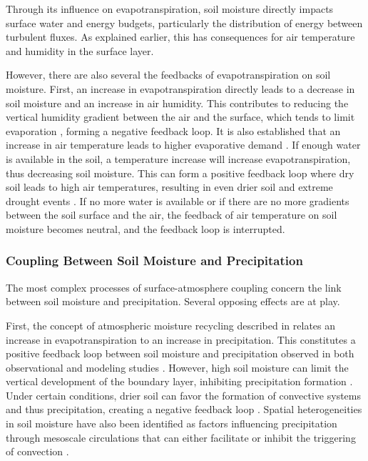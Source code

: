 Through its influence on evapotranspiration, soil moisture directly impacts surface water and energy budgets, particularly the distribution of energy between turbulent fluxes. As explained earlier, this has consequences for air temperature and humidity in the surface layer.

However, there are also several the feedbacks of evapotranspiration on soil moisture. First, an increase in evapotranspiration directly leads to a decrease in soil moisture and an increase in air humidity. This contributes to reducing the vertical humidity gradient between the air and the surface, which tends to limit evaporation \citep{allen_crop_2000}, forming a negative feedback loop. It is also established that an increase in air temperature leads to higher evaporative demand \citep{jarvis_stomatal_1986}. If enough water is available in the soil, a temperature increase will increase evapotranspiration, thus decreasing soil moisture. This can form a positive feedback loop where dry soil leads to high air temperatures, resulting in even drier soil and extreme drought events \citep{quesada_asymmetric_2012}. If no more water is available or if there are no more gradients between the soil surface and the air, the feedback of air temperature on soil moisture becomes neutral, and the feedback loop is interrupted.

\subsubsection*{Coupling Between Soil Moisture and Precipitation}

The most complex processes of surface-atmosphere coupling concern the link between soil moisture and precipitation. Several opposing effects are at play.

First, the concept of atmospheric moisture recycling described in \cite{eltahir_precipitation_1996} relates an increase in evapotranspiration to an increase in precipitation. This constitutes a positive feedback loop between soil moisture and precipitation observed in both observational and modeling studies \citep{koster_observational_2003, guo_glace_2006, wei_dissecting_2012, findell_probability_2011}. However, high soil moisture can limit the vertical development of the boundary layer, inhibiting precipitation formation \citep{findell_atmospheric_2003-1, ek_influence_2004}. Under certain conditions, drier soil can favor the formation of convective systems and thus precipitation, creating a negative feedback loop \citep{klein_dry_2020}. Spatial heterogeneities in soil moisture have also been identified as factors influencing precipitation through mesoscale circulations that can either facilitate or inhibit the triggering of convection \citep{findell_atmospheric_2003, taylor_frequency_2011, rochetin_morphology_2017}.


